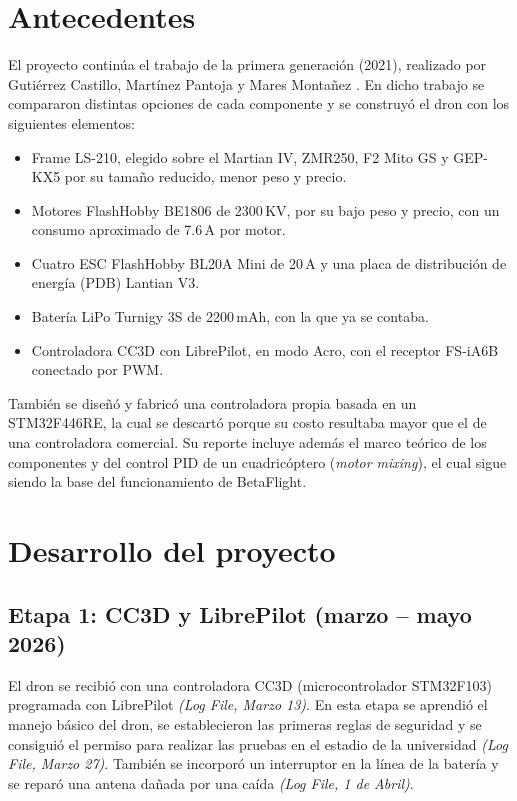 \documentclass[11pt,letterpaper]{article}
\newcommand{\logref}[1]{\textit{(Log File, #1)}}
\begin{document}
\section{Antecedentes}
El proyecto continúa el trabajo de la primera generación (2021), realizado por Gutiérrez Castillo, Martínez Pantoja y Mares Montañez \cite{reporte2021}. En dicho trabajo se compararon distintas opciones de cada componente y se construyó el dron con los siguientes elementos:
\begin{itemize}[nosep]
    \item Frame LS-210, elegido sobre el Martian IV, ZMR250, F2 Mito GS y GEP-KX5 por su tamaño reducido, menor peso y precio.
    \item Motores FlashHobby BE1806 de 2300\,KV, por su bajo peso y precio, con un consumo aproximado de 7.6\,A por motor.
    \item Cuatro ESC FlashHobby BL20A Mini de 20\,A y una placa de distribución de energía (PDB) Lantian V3.
    \item Batería LiPo Turnigy 3S de 2200\,mAh, con la que ya se contaba.
    \item Controladora CC3D con LibrePilot, en modo Acro, con el receptor FS-iA6B conectado por PWM.
\end{itemize}
También se diseñó y fabricó una controladora propia basada en un STM32F446RE, la cual se descartó porque su costo resultaba mayor que el de una controladora comercial. Su reporte incluye además el marco teórico de los componentes y del control PID de un cuadricóptero (\textit{motor mixing}), el cual sigue siendo la base del funcionamiento de BetaFlight.

\section{Desarrollo del proyecto}
\subsection{Etapa 1: CC3D y LibrePilot (marzo -- mayo 2026)}
El dron se recibió con una controladora CC3D (microcontrolador STM32F103) programada con LibrePilot \logref{Marzo 13}. En esta etapa se aprendió el manejo básico del dron, se establecieron las primeras reglas de seguridad y se consiguió el permiso para realizar las pruebas en el estadio de la universidad \logref{Marzo 27}. También se incorporó un interruptor en la línea de la batería y se reparó una antena dañada por una caída \logref{1 de Abril}.
\end{document}
